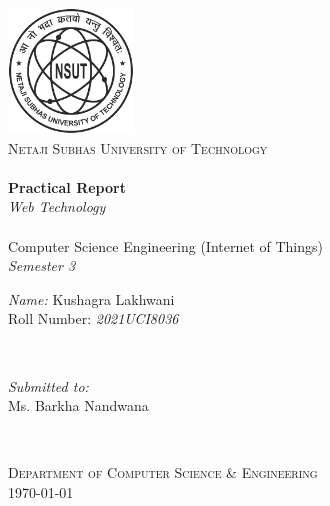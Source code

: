 \begin{titlepage}
    \begin{center}


        \includegraphics[width=0.25\textwidth]{res/NSUT.png}~\\[0.5cm]
        \textsc{\Large Netaji Subhas University of Technology}\\[2cm]


        \HRule \\[0.4cm]
        {
        \LARGE
        \textbf{Practical Report}\\[0.4cm]
        \emph{Web Technology}\\[0.4cm]
        }
        \HRule \\[1.5cm]


        {
        \large
        Computer Science Engineering (Internet of Things)\\[0.1cm]
        \textit{Semester 3} \\[2.7cm]
        }

        \begin{minipage}{0.5\textwidth}
            \begin{flushleft} \large
                \emph{Name:}  Kushagra Lakhwani \\
                Roll Number: \textit{2021UCI8036}
            \end{flushleft}
        \end{minipage}~
        \begin{minipage}{0.4\textwidth}
            \begin{center} \large
                \emph{Submitted to:} \\ Ms. Barkha Nandwana \\
            \end{center}
        \end{minipage}\\[2 cm]



        \vfill

        \textsc{\large Department of Computer Science \& Engineering}\\[0.4cm]



        {\large \today}

    \end{center}


\end{titlepage}
